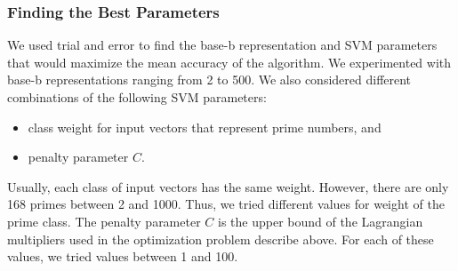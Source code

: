 \documentclass[10pt, titlepage]{amsart}
\newcommand\Z{{\mathbb Z}}
\newtheorem{cor}{Corollary}[subsection]
\theoremstyle{definition}
\begin{document}
%		
%		
	
	
	
	
	
	
	
	\subsubsection{Finding the Best Parameters}
	
	We used trial and error to find the base-b representation and SVM parameters that would maximize the mean accuracy of the algorithm.
	We experimented with base-b representations ranging from 2 to 500.
	We also considered different combinations of the following SVM parameters:
	\begin{itemize}
		\item class weight for input vectors that represent prime numbers, and
		\item penalty parameter $C$.
	\end{itemize}
	Usually, each class of input vectors has the same weight.
	However, there are only 168 primes between 2 and 1000. 
	Thus, we tried different values for weight of the prime class.
	The penalty parameter $C$ is the upper bound of the Lagrangian multipliers used in the optimization problem describe above.
	For each of these values, we tried values between 1 and 100.
	
\end{document}
